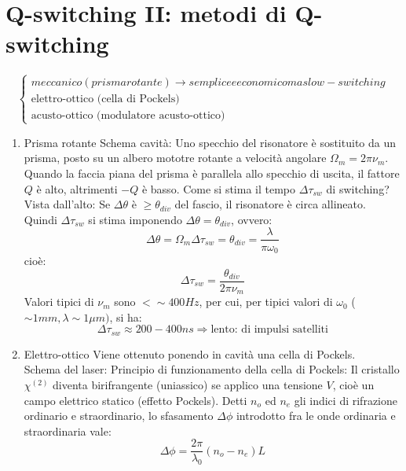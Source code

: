 \documentclass{book}
\def \D {\Delta}
\def \l {\lambda}
\theoremstyle{remark}
\begin{document}
\chapter{Q-switching II: metodi di Q-switching}
\[
\begin{cases}
meccanico (prisma rotante) \rightarrow semplice e economico ma slow-switching\\
\text{elettro-ottico (cella di Pockels)}\\
\text{acusto-ottico (modulatore acusto-ottico)}
\end{cases}
\]
\begin{enumerate}
\item Prisma rotante
Schema cavità:
Uno specchio del risonatore è sostituito da un prisma, posto su un albero mototre rotante a velocità angolare $\Omega_m = 2\pi \nu_m$. Quando la faccia piana del prisma è parallela allo specchio di uscita, il fattore $Q$ è alto, altrimenti $-Q$ è basso. Come si stima il tempo $\D\tau_{sw}$ di switching?\\
Vista dall'alto:
Se $\D\theta$ è $\geq \theta_{div}$ del fascio, il risonatore è circa allineato. Quindi $\D\tau_{sw}$ si stima imponendo $\D\theta = \theta_{div}$, ovvero:
\begin{equation*}
\D\theta = \Omega_m \D\tau_{sw} = \theta_{div} = \frac{\l}{\pi\omega_0}
\end{equation*}
cioè:
\begin{equation*}
\D\tau_{sw} = \frac{\theta_{div}}{2\pi\nu_m}
\end{equation*}
Valori tipici di $\nu_m$ sono $< \sim 400 Hz$, per cui, per tipici valori di $\omega_0$ ($\sim 1 mm, \l \sim 1 \mu m)$, si ha:
\begin{equation*}
\D\tau_{sw} \approx 200 -400 ns \Rightarrow \text{lento: di impulsi satelliti}
\end{equation*}
\item Elettro-ottico
Viene ottenuto ponendo in cavità una cella di Pockels.\\
Schema del laser:
Principio di funzionamento della cella di Pockels:
Il cristallo $\chi^{(2)}$ diventa birifrangente (uniassico) se applico una tensione $V$, cioè un campo elettrico statico (effetto Pockels). Detti $n_o$ ed $n_e$ gli indici di rifrazione ordinario e straordinario, lo sfasamento $\D\phi$ introdotto fra le onde ordinaria e straordinaria vale:
\begin{equation*}
\D\phi = \frac{2\pi}{\l_0} (n_o - n_e) L
\end{equation*}

\end{enumerate}
\end{document}
